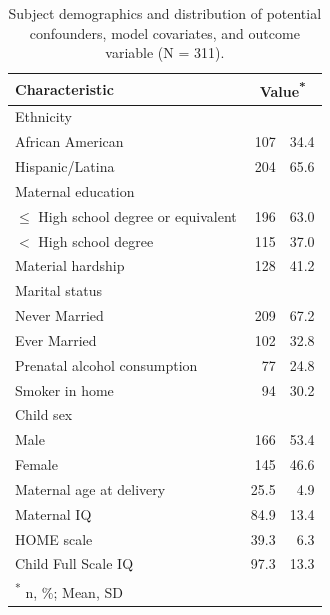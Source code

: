 \begingroup
\renewcommand{\arraystretch}{1.4}
\begin{table}[!ht] \centering 
\caption[Subject demographics in Mothers and Newborns cohort]{Subject demographics and distribution of potential confounders, model covariates, and outcome variable (N = 311).}
  \label{tab:1} 
  \addtolength{\tabcolsep}{-2pt}
\begin{tabular}{l|rr}
Characteristic & \multicolumn{2}{c}{Value\textsuperscript{*}} \\
\hline 
\hline
Ethnicity & \\
\hline
\hspace{1em}African American & 107 & 34.4 \\
\hline
\hspace{1em}Hispanic/Latina & 204 & 65.6 \\
\hline
Maternal education & \\
\hline
\hspace{1em} $\le$ High school degree or equivalent & 196 & 63.0 \\
\hline
\hspace{1em} $<$ High school degree & 115 & 37.0 \\
\hline
Material hardship & 128 & 41.2 \\
\hline
Marital status & \\
\hline
\hspace{1em}Never Married & 209 & 67.2 \\
\hline
\hspace{1em}Ever Married & 102 & 32.8 \\
\hline
Prenatal alcohol consumption & 77 & 24.8 \\
\hline
Smoker in home & 94 & 30.2 \\
\hline
Child sex & \\
\hline
\hspace{1em}Male & 166 & 53.4 \\
\hline
\hspace{1em}Female & 145 & 46.6 \\
\hline
Maternal age at delivery & 25.5 & 4.9 \\
\hline
Maternal IQ & 84.9 & 13.4 \\
\hline
HOME scale & 39.3 & 6.3 \\
\hline
Child Full Scale IQ & 97.3 & 13.3 \\
\hline 
\hline
\multicolumn{3}{l}{\textsuperscript{*} n, \%; Mean, SD} 
\end{tabular}
\end{table}
\endgroup 

